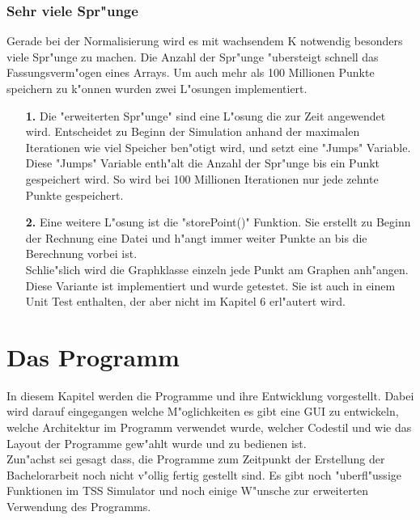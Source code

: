 \documentclass[11pt, a4paper, german]{article}
\theoremstyle{plain}
\begin{document}
	\subsubsection{Sehr viele Spr"unge}
	Gerade bei der Normalisierung wird es mit wachsendem K notwendig besonders viele Spr"unge zu machen. Die Anzahl der Spr"unge "ubersteigt schnell das Fassungsverm"ogen eines Arrays.	Um auch mehr als 100 Millionen Punkte speichern zu k"onnen wurden zwei L"osungen implementiert.\\
	\begin{itemize}
		\item[\textbf{1.}] Die "{}erweiterten Spr"unge"{} sind eine L"osung die zur Zeit angewendet wird. Entscheidet zu Beginn der Simulation anhand der maximalen Iterationen wie viel Speicher ben"otigt wird, und setzt eine "{}Jumps"{} Variable. Diese "{}Jumps"{} Variable enth"alt die Anzahl der Spr"unge bis ein Punkt gespeichert wird. So wird bei 100 Millionen Iterationen nur jede zehnte Punkte gespeichert. \\
		\item[\textbf{2.}] Eine weitere L"osung ist die "{}storePoint()"{} Funktion. Sie erstellt zu Beginn der Rechnung eine Datei und h"angt immer weiter Punkte an bis die Berechnung vorbei ist.\\
		Schlie"slich wird die Graphklasse einzeln jede Punkt am Graphen anh"angen.\\ 
		Diese Variante ist implementiert und wurde getestet. Sie ist auch in einem Unit Test enthalten, der aber nicht im Kapitel 6 erl"autert wird.
	\end{itemize}

	
	
\clearpage	
\section{Das Programm}
In diesem Kapitel werden die Programme und ihre Entwicklung vorgestellt. Dabei wird darauf eingegangen welche M"oglichkeiten es gibt eine GUI zu entwickeln, welche Architektur im Programm verwendet wurde, welcher Codestil und wie das Layout der Programme gew"ahlt wurde und zu bedienen ist.\\
Zun"achst sei gesagt dass, die Programme zum Zeitpunkt der Erstellung der Bachelorarbeit noch nicht v"ollig fertig gestellt sind. Es gibt noch "uberfl"ussige Funktionen im TSS Simulator und noch einige W"unsche zur erweiterten Verwendung des Programms. 
\end{document}
